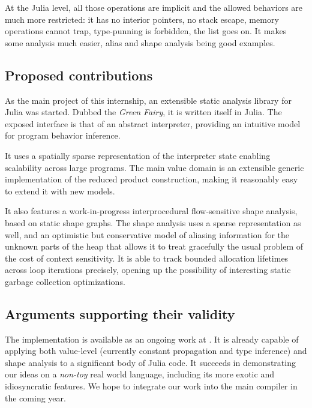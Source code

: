 \documentclass[11pt]{article}
\begin{document}
At the Julia level, all those operations are implicit and the allowed behaviors are much more restricted: it has no interior pointers, no stack escape, memory operations cannot trap, type-punning is forbidden, the list goes on. It makes some analysis much easier, alias and shape analysis being good examples. 


\subsection*{Proposed contributions}

As the main project of this internship, an extensible static analysis library for Julia was started. Dubbed the \emph{Green Fairy}, it is written itself in Julia. The exposed interface is that of an abstract interpreter, providing an intuitive model for program behavior inference.

It uses a spatially sparse representation of the interpreter state enabling scalability across large programs. The main value domain is an extensible generic implementation of the reduced product construction, making it reasonably easy to extend it with new models.

It also features a work-in-progress interprocedural flow-sensitive shape analysis, based on static shape graphs\cite{ssc}. The shape analysis uses a sparse representation as well, and an optimistic but conservative model of aliasing information for the unknown parts of the heap that allows it to treat gracefully the usual problem of the cost of context sensitivity. It is able to track bounded allocation lifetimes across loop iterations precisely, opening up the possibility of interesting static garbage collection optimizations.

\subsection*{Arguments supporting their validity}

The implementation is available as an ongoing work at \cite{gf-web}. It is already capable of applying both value-level (currently constant propagation and type inference) and shape analysis to a significant body of Julia code.
It succeeds in demonstrating our ideas on a \emph{non-toy} real world language, including its more exotic and idiosyncratic features.
We hope to integrate our work into the main compiler in the coming year.
\end{document}
